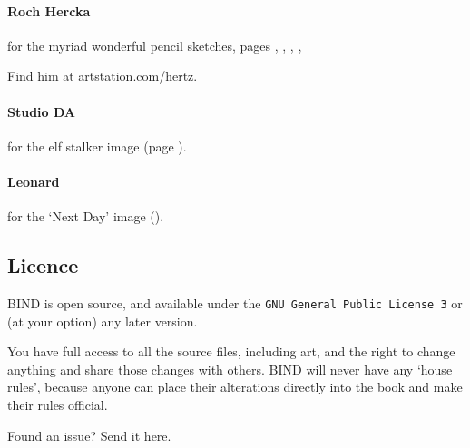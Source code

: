 \begin{multicols}{2}
\paragraph{Roch Hercka} for the myriad wonderful pencil sketches, pages 
\pageref{Roch_Hercka/five_races}, 
\pageref{Roch_Hercka/illusion_trogdor}, 
\pageref{Roch_Hercka/xp-1}, 
\pageref{Roch_Hercka/xp-2}, 

Find him at artstation.com/hertz.

\paragraph{Studio DA}
for the elf stalker image
(page \pageref{Studio_DA/elf_stalker}).

\paragraph{Leonard}
for the `Next Day' image ().

\subsection*{Licence}

BIND is open source, and available under the {\tt GNU General Public License 3} or (at your option) any later version.

You have full access to all the source files, including art, and the right to change anything and share those changes with others.
BIND will never have any `house rules', because anyone can place their alterations directly into the book and make their rules official.

\begin{center}
  
  Found an issue?
  Send it here.
\end{center}

\end{multicols}

